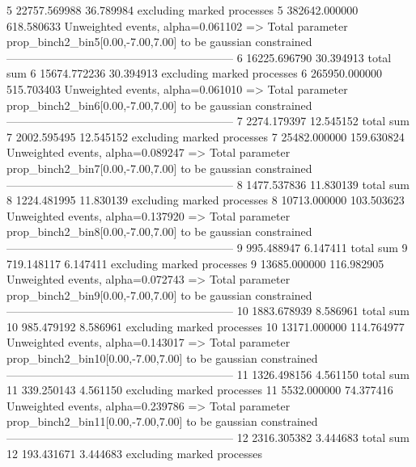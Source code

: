 5          22757.569988    36.789984       excluding marked processes    
5          382642.000000   618.580633      Unweighted events, alpha=0.061102
  => Total parameter prop_binch2_bin5[0.00,-7.00,7.00] to be gaussian constrained
------------------------------------------------------------
6          16225.696790    30.394913       total sum                     
6          15674.772236    30.394913       excluding marked processes    
6          265950.000000   515.703403      Unweighted events, alpha=0.061010
  => Total parameter prop_binch2_bin6[0.00,-7.00,7.00] to be gaussian constrained
------------------------------------------------------------
7          2274.179397     12.545152       total sum                     
7          2002.595495     12.545152       excluding marked processes    
7          25482.000000    159.630824      Unweighted events, alpha=0.089247
  => Total parameter prop_binch2_bin7[0.00,-7.00,7.00] to be gaussian constrained
------------------------------------------------------------
8          1477.537836     11.830139       total sum                     
8          1224.481995     11.830139       excluding marked processes    
8          10713.000000    103.503623      Unweighted events, alpha=0.137920
  => Total parameter prop_binch2_bin8[0.00,-7.00,7.00] to be gaussian constrained
------------------------------------------------------------
9          995.488947      6.147411        total sum                     
9          719.148117      6.147411        excluding marked processes    
9          13685.000000    116.982905      Unweighted events, alpha=0.072743
  => Total parameter prop_binch2_bin9[0.00,-7.00,7.00] to be gaussian constrained
------------------------------------------------------------
10         1883.678939     8.586961        total sum                     
10         985.479192      8.586961        excluding marked processes    
10         13171.000000    114.764977      Unweighted events, alpha=0.143017
  => Total parameter prop_binch2_bin10[0.00,-7.00,7.00] to be gaussian constrained
------------------------------------------------------------
11         1326.498156     4.561150        total sum                     
11         339.250143      4.561150        excluding marked processes    
11         5532.000000     74.377416       Unweighted events, alpha=0.239786
  => Total parameter prop_binch2_bin11[0.00,-7.00,7.00] to be gaussian constrained
------------------------------------------------------------
12         2316.305382     3.444683        total sum                     
12         193.431671      3.444683        excluding marked processes    
